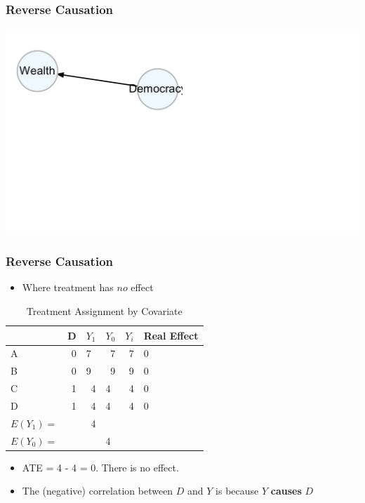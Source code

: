 \documentclass[xcolor=x11names,compress]{beamer}\usepackage[]{graphicx}\usepackage[]{color}
\makeatletter
\def\maxwidth{ %
  \ifdim\Gin@nat@width>\linewidth
    \linewidth
  \else
    \Gin@nat@width
  \fi
}
\newenvironment{knitrout}{}{} %
\renewcommand{\(}{\begin{columns}}
\renewcommand{\)}{\end{columns}}
\newcommand{\<}[1]{\begin{column}{#1}}
\renewcommand{\>}{\end{column}}
\makeatother
\begin{document}
\begin{frame}
\frametitle{Reverse Causation}
\begin{knitrout}
\color{fgcolor}
\includegraphics[width=\maxwidth]{figure/unnamed-chunk-7-1} 

\end{knitrout}
\end{frame}

\begin{frame}
\frametitle{Reverse Causation}
\begin{itemize}
\item Where treatment has $no$ effect
\end{itemize}
\begin{table}[htbp]
  \centering
  \caption{Treatment Assignment by Covariate}
    \begin{tabular}{|l|r|r|l|r|l|}
    \hline
          &  \multicolumn{1}{l|}{D} & \multicolumn{1}{l|}{$Y_1$} & $Y_0$  & \multicolumn{1}{l|}{$Y_i$} & Real Effect \bigstrut\\
    \hline
    A     & 0     & \multicolumn{1}{l|}{7} & \multicolumn{1}{r|}{\cellcolor{teal}7} & 7     & 0 \bigstrut\\
    \hline
    B     & 0     & \multicolumn{1}{l|}{9} & \multicolumn{1}{r|}{\cellcolor{teal}9} & 9     & 0 \bigstrut\\
    \hline
    C     &  1     & \cellcolor{teal}4     & 4     & 4     & 0 \bigstrut\\
    \hline
    D     & 1     & \cellcolor{teal}4     & 4     & 4     & 0 \bigstrut\\
    \hline\pause
    $E(Y_1)=$ & & 4 & & \bigstrut\\
    \hline
    $E(Y_0)=$ &  & & 4 & \bigstrut\\
    \hline
    \end{tabular}%
  \label{tab:addlabel}%
\end{table}%
\begin{itemize}
\pause
\item ATE = 4 - 4 = 0. There is no effect. 
\item The (negative) correlation between $D$ and $Y$ is because $Y$ \textbf{causes} $D$
\end{itemize}
\end{frame}
\end{document}
